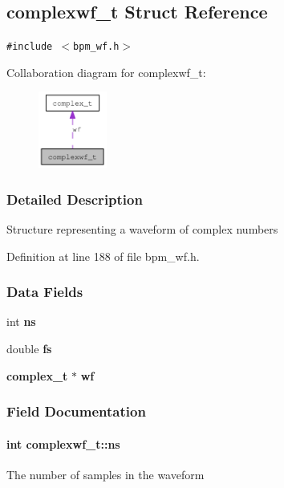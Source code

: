 \subsection{complexwf\_\-t Struct Reference}
\label{structcomplexwf__t}
{\tt \#include $<$bpm\_\-wf.h$>$}

Collaboration diagram for complexwf\_\-t:\nopagebreak
\begin{figure}[H]
\begin{center}
\leavevmode
\includegraphics[width=64pt]{structcomplexwf__t__coll__graph}
\end{center}
\end{figure}


\subsubsection{Detailed Description}
Structure representing a waveform of complex numbers 

Definition at line 188 of file bpm\_\-wf.h.\subsubsection*{Data Fields}
\begin{CompactItemize}
\item 
int {\bf ns}
\item 
double {\bf fs}
\item 
{\bf complex\_\-t} $\ast$ {\bf wf}
\end{CompactItemize}


\subsubsection{Field Documentation}
\paragraph[ns]{\setlength{\rightskip}{0pt plus 5cm}int {\bf complexwf\_\-t::ns}}\hfill\label{structcomplexwf__t_6ca8e343a776b345f6753539f2c2d865}


The number of samples in the waveform 

